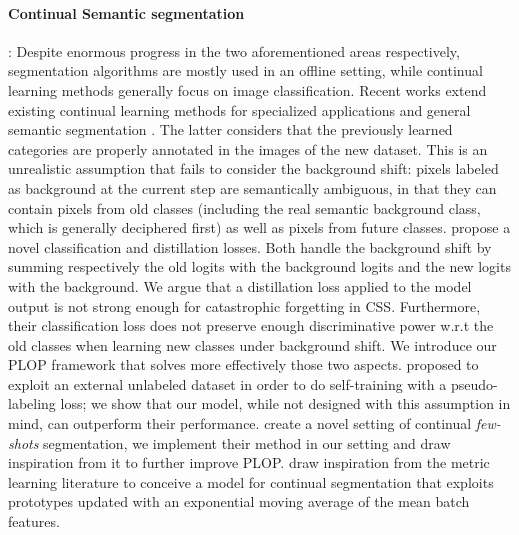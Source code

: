 \paragraph{Continual Semantic segmentation}: Despite enormous progress in the two
aforementioned areas respectively, segmentation algorithms are mostly used in an offline setting,
while continual learning methods generally focus on image classification. Recent works extend
existing continual learning methods \citep{li2018lwf,hou2019ucir} for specialized applications
\citep{ozdemir2018learnthenewkeeptheold,ozdemir2019segmentationanotomical,tasar19incrementsegmentationremotesensing}
and general semantic segmentation \citep{michieli2019ilt}. The latter considers that the previously
learned categories are properly annotated in the images of the new dataset. This is an unrealistic
assumption that fails to consider the background shift: pixels labeled as background at the current
step are semantically ambiguous, in that they can contain pixels from old classes (including the
real semantic background class, which is generally deciphered first) as well as pixels from future
classes. \cite{cermelli2020modelingthebackground} propose a novel classification and
distillation losses. Both handle the background shift by summing respectively the old logits with
the background logits and the new logits with the background. We argue that a distillation loss
applied to the model output is not strong enough for catastrophic forgetting in \ac{CSS}. Furthermore,
their classification loss does not preserve enough discriminative power w.r.t the old classes when
learning new classes under background shift. We introduce our PLOP framework that solves more
effectively those two aspects. \cite{yu2020continualsegmentationselftraining} proposed to
exploit an external unlabeled dataset in order to do self-training with a pseudo-labeling loss; we
show that our model, while not designed with this assumption in mind, can outperform their
performance. \cite{cermelli2020fewshotcontinualsegm} create a novel setting of
continual \textit{few-shots} segmentation, we implement their method in our setting and draw
inspiration from it to further improve PLOP. \cite{michieli2021sdr} draw
inspiration from the metric learning literature to conceive a model for continual segmentation that
exploits prototypes updated with an exponential moving average of the mean batch features.

